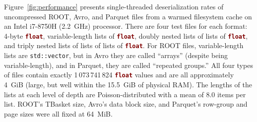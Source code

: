 \documentclass{webofc}
\begin{document}
Figure~\ref{fig:performance} presents single-threaded deserialization rates of uncompressed ROOT, Avro, and Parquet files from a warmed filesystem cache on an Intel i7-8750H (2.2~GHz) processor. There are four test files for each format: 4-byte \textcolor{Maroon}{\tt\textbf{float}}, variable-length lists of \textcolor{Maroon}{\tt\textbf{float}}, doubly nested lists of lists of \textcolor{Maroon}{\tt\textbf{float}}, and triply nested lists of lists of lists of \textcolor{Maroon}{\tt\textbf{float}}. For ROOT files, variable-length lists are {\tt std::vector}, but in Avro they are called ``arrays'' (despite being variable-length), and in Parquet, they are called ``repeated groups.'' All four types of files contain exactly 1\,073\,741\,824 \textcolor{Maroon}{\tt\textbf{float}} values and are all approximately 4~GiB (large, but well within the 15.5~GiB of physical RAM). The lengths of the lists at each level of depth are Poisson-distributed with a mean of 8.0 items per list. ROOT's TBasket size, Avro's data block size, and Parquet's row-group and page sizes were all fixed at 64~MiB.
\end{document}
